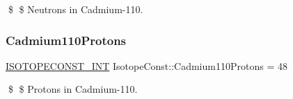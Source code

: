 \$ \$ Neutrons in Cadmium-\/110. \mbox{\label{group___isotope_const-_cadmium-_cd110_gaaca674fcee1c31cb4198cd5725ca9e49}} 
\subsubsection{\texorpdfstring{Cadmium110\+Protons}{Cadmium110Protons}}
{\footnotesize\ttfamily \mbox{\hyperlink{group___isotope_const-_macros_ga5f18360b3e99483a35c32d789e62621c}{I\+S\+O\+T\+O\+P\+E\+C\+O\+N\+S\+T\+\_\+\+I\+NT}} Isotope\+Const\+::\+Cadmium110\+Protons = 48}

\$ \$ Protons in Cadmium-\/110. 